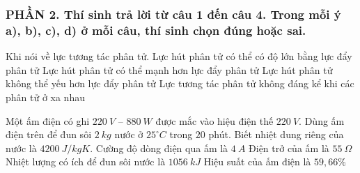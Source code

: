 \subsubsection*{PHẦN 2. Thí sinh trả lời từ câu 1 đến câu 4. Trong mỗi ý a), b), c), d) ở mỗi câu, thí sinh chọn đúng hoặc sai.}
\setcounter{ex}{0}
\begin{ex}
	Khi nói về lực tương tác phân tử.
	\choiceTFt
	{\True Lực hút phân tử có thể có độ lớn bằng lực đẩy phân tử}
	{\True Lực hút phân tử có thể mạnh hơn lực đẩy phân tử}
	{Lực hút phân tử không thể yếu hơn lực đẩy phân tử}
	{\True Lực tương tác phân tử không đáng kể khi các phân tử ở xa nhau}
	\loigiai{
		
		\begin{itemchoice}
			\itemch 
			\itemch
			\itemch 
			\itemch
		\end{itemchoice}
	}
\end{ex}

\begin{ex}
	Một ấm điện có ghi $220\ V$ – $880\ W$ được mắc vào hiệu điện thế $220\ V$. Dùng ấm điện trên để đun sôi $2\ kg$ nước ở $25^\circ C$ trong $20$ phút. Biết nhiệt dung riêng của nước là $4200\ J/kgK$.
	\choiceTFt
	{\True Cường độ dòng điện qua ấm là $4\ A$}
	{\True Điện trở của ấm là $55\ \Omega$}
	{Nhiệt lượng có ích để đun sôi nước là $1056\ kJ$}
	{\True Hiệu suất của ấm điện là $59,66\%$}
\end{ex}

